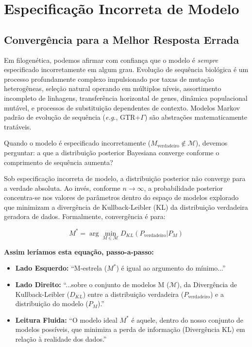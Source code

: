 \section{Especificação Incorreta de Modelo}

\subsection{Convergência para a Melhor Resposta Errada}

Em filogenética, podemos afirmar com confiança que o modelo é \textit{sempre} especificado incorretamente em algum grau. Evolução de sequência biológica é um processo profundamente complexo impulsionado por taxas de mutação heterogêneas, seleção natural operando em múltiplos níveis, assortimento incompleto de linhagens, transferência horizontal de genes, dinâmica populacional mutável, e processos de substituição dependentes de contexto. Modelos Markov padrão de evolução de sequência (\textit{e.g.}, GTR+$\Gamma$) são abstrações matematicamente tratáveis.

Quando o modelo é especificado incorretamente ($M_{\text{verdadeiro}} \notin \mathcal{M}$), devemos perguntar: a que a distribuição posterior Bayesiana converge conforme o comprimento de sequência aumenta?

Sob especificação incorreta de modelo, a distribuição posterior não converge para a verdade absoluta. Ao invés, conforme $n \to \infty$, a probabilidade posterior concentra-se nos valores de parâmetros dentro do espaço de modelos explorado que minimizam a divergência de Kullback-Leibler (KL) da distribuição verdadeira geradora de dados. Formalmente, convergência é para:

$$M^* = \arg\min_{M \in \mathcal{M}} D_{KL}(P_{\text{verdadeiro}} | P_M)$$

\textbf{Assim leríamos esta equação, passo-a-passo:}

\begin{itemize}
    \item \textbf{Lado Esquerdo:} ``M-estrela ($M^*$) é igual ao argumento do mínimo...''
    \item \textbf{Lado Direito:} ``...sobre o conjunto de modelos M ($\mathcal{M}$), da Divergência de Kullback-Leibler ($D_{KL}$) entre a distribuição verdadeira ($P_{\text{verdadeiro}}$) e a distribuição do modelo ($P_M$).''
    \item \textbf{Leitura Fluida:} ``O modelo ideal $M^*$ é aquele, dentro do nosso conjunto de modelos possíveis, que minimiza a perda de informação (Divergência KL) em relação à realidade dos dados.''
\end{itemize}

